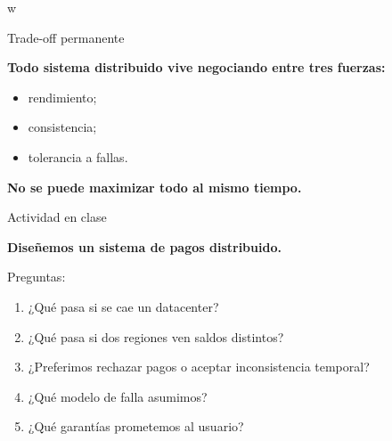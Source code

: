 w\documentclass[aspectratio=169]{beamer}
\begin{document}
\begin{frame}{Trade-off permanente}

\Large

\begin{center}
\textbf{Todo sistema distribuido vive negociando entre tres fuerzas:}
\end{center}

\vspace{0.7cm}

\begin{itemize}
    \item rendimiento;
    \item consistencia;
    \item tolerancia a fallas.
\end{itemize}

\vspace{0.7cm}

\begin{center}
\textbf{No se puede maximizar todo al mismo tiempo.}
\end{center}

\end{frame}

\begin{frame}{Actividad en clase}

\Large

\begin{center}
\textbf{Diseñemos un sistema de pagos distribuido.}
\end{center}

\vspace{0.7cm}

\normalsize

Preguntas:

\begin{enumerate}
    \item ¿Qué pasa si se cae un datacenter?
    \item ¿Qué pasa si dos regiones ven saldos distintos?
    \item ¿Preferimos rechazar pagos o aceptar inconsistencia temporal?
    \item ¿Qué modelo de falla asumimos?
    \item ¿Qué garantías prometemos al usuario?
\end{enumerate}

\end{frame}
\end{document}
